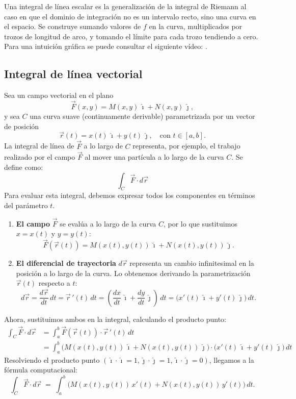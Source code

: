 Una integral de línea escalar es la generalización de la integral de Riemann al caso en que el dominio de integración no es un intervalo recto, sino una curva en el espacio. Se construye sumando valores de $f$ en la curva, multiplicados por trozos de longitud de arco, y tomando el límite para cada trozo tendiendo a cero. Para una intuición gráfica se puede consultar el siguiente vídeo: \parencite{scalar_line_integral}.

\subsection{Integral de línea vectorial}

Sea un campo vectorial en el plano
$$
\vec{F}(x,y) = M(x,y)\,\hat{\imath} + N(x,y)\,\hat{\jmath},
$$
y sea $C$ una curva suave (continuamente derivable) parametrizada por un vector de posición
$$
\vec{r}(t) = x(t)\,\hat{\imath} + y(t)\,\hat{\jmath}, \quad \text{con } t \in [a,b].
$$
La integral de línea de $\vec{F}$ a lo largo de $C$ representa, por ejemplo, el trabajo realizado por el campo $\vec{F}$ al mover una partícula a lo largo de la curva $C$. Se define como:
$$
\int_C \vec{F}\cdot d\vec{r}
$$
Para evaluar esta integral, debemos expresar todos los componentes en términos del parámetro $t$.

\begin{enumerate}
    \item \textbf{El campo} $\vec{F}$ se evalúa a lo largo de la curva $C$, por lo que sustituimos $x=x(t)$ y $y=y(t)$:
    $$
    \vec{F}(\vec{r}(t)) = M(x(t),y(t))\,\hat{\imath} + N(x(t),y(t))\,\hat{\jmath}.
    $$

    \item \textbf{El diferencial de trayectoria} $d\vec{r}$ representa un cambio infinitesimal en la posición a lo largo de la curva. Lo obtenemos derivando la parametrización $\vec{r}(t)$ respecto a $t$:
    $$
    d\vec{r} = \frac{d\vec{r}}{dt}\,dt = \vec{r}\,'(t)\,dt = \left( \frac{dx}{dt}\,\hat{\imath} + \frac{dy}{dt}\,\hat{\jmath} \right)\,dt = \big( x'(t)\,\hat{\imath} + y'(t)\,\hat{\jmath} \big)\,dt.
    $$
\end{enumerate}

Ahora, sustituimos ambos en la integral, calculando el producto punto:
\begin{align*}
\int_C \vec{F}\cdot d\vec{r} &= \int_a^b \vec{F}(\vec{r}(t)) \cdot \vec{r}\,'(t)\,dt \\
&= \int_a^b \Big( M(x(t),y(t))\,\hat{\imath} + N(x(t),y(t))\,\hat{\jmath} \Big) \cdot \Big( x'(t)\,\hat{\imath} + y'(t)\,\hat{\jmath} \Big)\,dt
\end{align*}
Resolviendo el producto punto $(\hat{\imath}\cdot\hat{\imath}=1, \hat{\jmath}\cdot\hat{\jmath}=1, \hat{\imath}\cdot\hat{\jmath}=0)$, llegamos a la fórmula computacional:
$$
\int_C \vec{F}\cdot d\vec{r} \;=\; \int_a^b \Big( M(x(t),y(t))\,x'(t) + N(x(t),y(t))\,y'(t) \Big)\,dt.
$$

